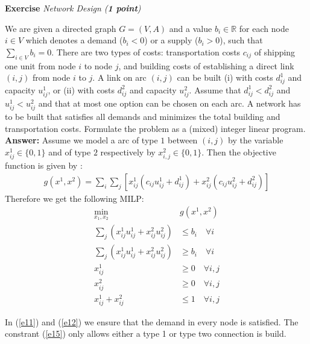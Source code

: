 \documentclass[a4paper,10pt]{article}
\newcounter{exc}
\newenvironment{exercise}[1]%
{\refstepcounter{exc}\textbf{Exercise \arabic{exc}} \emph{#1}\\}
{

\hrulefill\medskip}%
\newcommand{\R}{\mathbb{R}}
\begin{document}
\begin{exercise}{Network Design (\textbf{1 point})}\label{ex:nd1}

We are given a directed graph $G=(V,A)$ and a value $b_i \in \R$ for each node $i\in V$ which denotes a demand ($b_i < 0$) or a supply ($b_i > 0$), such that $\sum_{i\in V} b_i=0$. 
There are two types of costs: transportation costs $c_{ij}$ of shipping one unit from node $i$ to node $j$, and building costs of establishing a direct link $(i,j)$ from node $i$ to $j$. 
A link on arc $(i,j)$ can be built (i) with costs $d_{ij}^1$ and capacity $u_{ij}^1$, or (ii) with costs $d_{ij}^2$ and capacity $u_{ij}^2$. Assume that $d_{ij}^1<d_{ij}^2$ and $u_{ij}^1<u_{ij}^2$ and that at most one option can be chosen on each arc. 
A network has to be built that satisfies all demands and minimizes the total building and transportation costs. Formulate the problem as a (mixed) integer linear program.
\textbf{Answer:}
  Assume we model a arc of type $1$ between $(i,j)$ by the variable $x^1_{ij}\in\{0,1\}$ and of type $2$ respectively by $x^2_{i,j}\in\{0,1\}$. Then the objective function is given by : 
\begin{align}
  g(x^1,x^2) = \sum\limits_i \sum\limits_j \left[x^1_{ij}(c_{ij} u^1_{ij}+d^1_{ij}) + x^2_{ij}(c_{ij} u^2_{ij}+d^2_{ij}) \right]
\end{align}
Therefore we get the following MILP:
\begin{align}
  \min_{x_1,x_2}                               & g(x^1,x^2) \\ 
  \sum_j (x^1_{ij}u^1_{ij} + x^2_{ij}u^2_{ij}) & \leq b_i \quad \forall i   \label{e11}\\
  \sum_j (x^1_{ij}u^1_{ij} + x^2_{ij}u^2_{ij}) & \geq b_i \quad \forall i   \label{e12}\\
  x^1_{ij}                                     & \geq 0   \quad \forall i,j \label{e13}\\ x^2_{ij}                                     & \geq 0   \quad \forall i,j \label{e14}\\ 
  x^1_{ij}+ x^2_{ij}                            & \leq 1   \quad \forall i,j \label{e15}
\end{align}

  In (\ref{e11}) and (\ref{e12}) we ensure that the demand in every node is satisfied. The constrant (\ref{e15}) only allows either a type 1 or type two connection is build.

\end{exercise}
\end{document}
